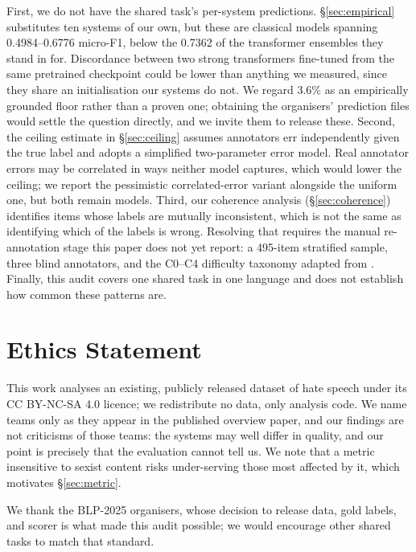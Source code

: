 \documentclass[11pt]{article}
\begin{document}
First, we do not have the shared task's per-system predictions. \S\ref{sec:empirical}
substitutes ten systems of our own, but these are classical models spanning
0.4984--0.6776 micro-F1, below the 0.7362 of the transformer ensembles they stand
in for. Discordance between two strong transformers fine-tuned from the same
pretrained checkpoint could be lower than anything we measured, since they share
an initialisation our systems do not. We regard 3.6\% as an empirically grounded
floor rather than a proven one; obtaining the organisers' prediction files would
settle the question directly, and we invite them to release these. Second, the ceiling estimate in
\S\ref{sec:ceiling} assumes annotators err independently given the true label
and adopts a simplified two-parameter error model. Real annotator errors may be
correlated in ways neither model captures, which would lower the ceiling; we
report the pessimistic correlated-error variant alongside the uniform one, but
both remain models. Third, our coherence analysis (\S\ref{sec:coherence})
identifies items whose labels are mutually inconsistent, which is not the same
as identifying which of the labels is wrong. Resolving that requires the manual
re-annotation stage this paper does not yet report: a 495-item stratified sample,
three blind annotators, and the C0--C4 difficulty taxonomy adapted from
\citet{jin2026broken}. Finally, this audit covers one shared task in one
language and does not establish how common these patterns are.

\section*{Ethics Statement}

This work analyses an existing, publicly released dataset of hate speech under
its CC BY-NC-SA 4.0 licence; we redistribute no data, only analysis code. We
name teams only as they appear in the published overview paper, and our findings
are not criticisms of those teams: the systems may well differ in quality, and
our point is precisely that the evaluation cannot tell us. We note that a metric
insensitive to sexist content risks under-serving those most affected by it,
which motivates \S\ref{sec:metric}.

We thank the BLP-2025 organisers, whose decision to release data, gold labels,
and scorer is what made this audit possible; we would encourage other shared
tasks to match that standard.



\end{document}
